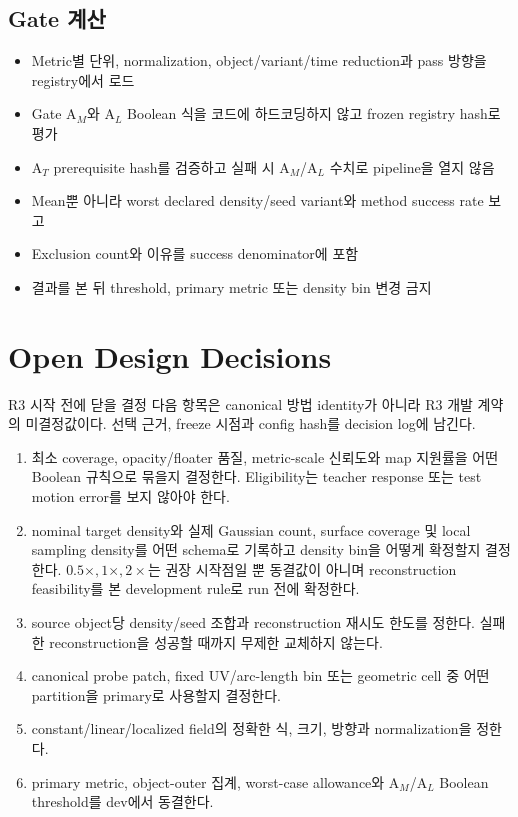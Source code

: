 \documentclass[10pt,a4paper]{article}
\begin{document}
\subsection{Gate 계산}

\begin{itemize}
  \item[$\square$] Metric별 단위, normalization, object/variant/time reduction과 pass 방향을 registry에서 로드
  \item[$\square$] Gate A\(_M\)와 A\(_L\) Boolean 식을 코드에 하드코딩하지 않고
  frozen registry hash로 평가
  \item[$\square$] A\(_T\) prerequisite hash를 검증하고 실패 시 A\(_M\)/A\(_L\) 수치로 pipeline을 열지 않음
  \item[$\square$] Mean뿐 아니라 worst declared density/seed variant와 method success rate 보고
  \item[$\square$] Exclusion count와 이유를 success denominator에 포함
  \item[$\square$] 결과를 본 뒤 threshold, primary metric 또는 density bin 변경 금지
\end{itemize}

\section{Open Design Decisions}
\label{sec:r3-chapter-5}

\begin{decisionbox}{R3 시작 전에 닫을 결정}
다음 항목은 canonical 방법 identity가 아니라 R3 개발 계약의 미결정값이다.
선택 근거, freeze 시점과 config hash를 decision log에 남긴다.
\end{decisionbox}

\begin{enumerate}
  \item {}
  최소 coverage, opacity/floater 품질, metric-scale 신뢰도와 map 지원률을 어떤 Boolean 규칙으로 묶을지 결정한다.
  Eligibility는 teacher response 또는 test motion error를 보지 않아야 한다.
  \item {}
  nominal target density와 실제 Gaussian count, surface coverage 및 local sampling density를 어떤 schema로
  기록하고 density bin을 어떻게 확정할지 결정한다. \(0.5\times,1\times,2\times\)는 권장 시작점일 뿐
  동결값이 아니며 reconstruction feasibility를 본 development rule로 run 전에 확정한다.
  \item {}
  source object당 density/seed 조합과 reconstruction 재시도 한도를 정한다.
  실패한 reconstruction을 성공할 때까지 무제한 교체하지 않는다.
  \item {}
  canonical probe patch, fixed UV/arc-length bin 또는 geometric cell 중 어떤 partition을 primary로 사용할지 결정한다.
  \item {}
  constant/linear/localized field의 정확한 식, 크기, 방향과 normalization을 정한다.
  \item {}
  primary metric, object-outer 집계, worst-case allowance와 A\(_M\)/A\(_L\) Boolean threshold를 dev에서 동결한다.
\end{enumerate}
\end{document}
